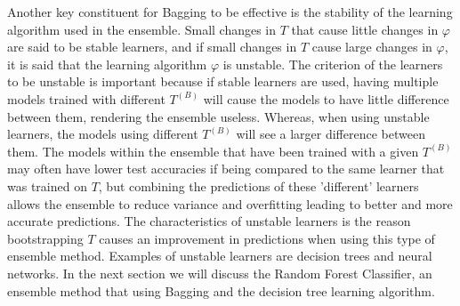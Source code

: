 \documentclass[../SMLreport_template.tex]{subfiles}
\begin{document}
Another key constituent for Bagging to be effective is the stability of the learning algorithm used in the ensemble. Small changes in $T$ that cause little changes in $\varphi$ are said to be stable learners, and if small changes in $T$ cause large changes in $\varphi$, it is said that the learning algorithm $\varphi$ is unstable. The criterion of the learners to be unstable is important because if stable learners are used, having multiple models trained with different $T^{(B)}$ will cause the models to have little difference between them, rendering the ensemble useless. Whereas, when using unstable learners, the models using different $T^{(B)}$ will see a larger difference between them. The models within the ensemble that have been trained with a given $T^{(B)}$ may often have lower test accuracies if being compared to the same learner that was trained on $T$, but combining the predictions of these 'different' learners allows the ensemble to reduce variance and overfitting leading to better and more accurate predictions. The characteristics of unstable learners is the reason bootstrapping $T$ causes an improvement in predictions when using this type of ensemble method. Examples of unstable learners are decision trees and neural networks. In the next section we will discuss the Random Forest Classifier, an ensemble method that using Bagging and the decision tree learning algorithm.
\end{document}
